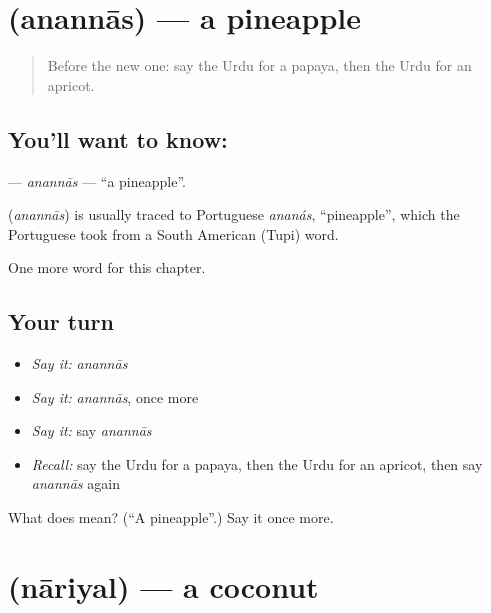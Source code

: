 \section[\texorpdfstring{\ur{اناناس} (anannās)}{اناناس (anannās)}]{ (anannās) — a pineapple}

\label{lesson:UR-C252-anannas}



\begin{quote}
Before the new one: say the Urdu for a papaya, then the Urdu for an apricot.
\end{quote}

\subsection*{You'll want to know: }
\textbf{} — \emph{anannās} — \textquotedblleft{}a pineapple\textquotedblright{}.

\begin{cousinweb}
\textbf{} (\emph{anannās}) is usually traced to Portuguese \emph{ananás}, \textquotedblleft{}pineapple\textquotedblright{}, which the Portuguese took from a South American (Tupi) word.
\end{cousinweb}

\begin{grammarlens}[title={What you've built}]
One more word for this chapter.
\end{grammarlens}

\subsection*{Your turn}
\begin{itemize}
\raggedright
  \item \emph{Say it:} \emph{anannās}
  \item \emph{Say it:} \emph{anannās}, once more
  \item \emph{Say it:} say \emph{anannās}
  \item \emph{Recall:} say the Urdu for a papaya, then the Urdu for an apricot, then say \emph{anannās} again
\end{itemize}

\begin{tcolorbox}[breakable,colback=teal!4,colframe=teal!35!black,title={Before you move on}]
What does  mean? (\textquotedblleft{}A pineapple\textquotedblright{}.) Say it once more.
\end{tcolorbox}
\section[\texorpdfstring{\ur{ناریل} (nāriyal)}{ناریل (nāriyal)}]{ (nāriyal) — a coconut}

